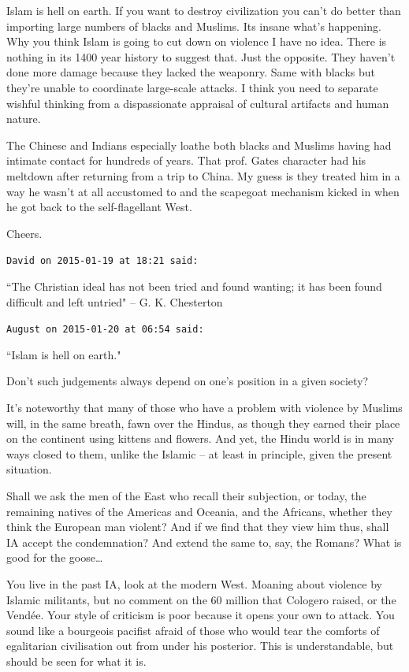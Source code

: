 \begin{footnotesize}
\begin{sffamily}
Islam is hell on earth. If you want to destroy civilization you can't do better than importing large numbers of blacks and Muslims. Its insane what's happening. Why you think Islam is going to cut down on violence I have no idea. There is nothing in its 1400 year history to suggest that. Just the opposite. They haven't done more damage because they lacked the weaponry. Same with blacks but they're unable to coordinate large-scale attacks. I think you need to separate wishful thinking from a dispassionate appraisal of cultural artifacts and human nature.

The Chinese and Indians especially loathe both blacks and Muslims having had intimate contact for hundreds of years. That prof. Gates character had his meltdown after returning from a trip to China. My guess is they treated him in a way he wasn't at all accustomed to and the scapegoat mechanism kicked in when he got back to the self-flagellant West.

Cheers.


\hfill

\texttt{David on 2015-01-19 at 18:21 said: }

``The Christian ideal has not been tried and found wanting; it has been found difficult and left untried" – G. K. Chesterton


\hfill

\texttt{August on 2015-01-20 at 06:54 said: }

``Islam is hell on earth."

Don't such judgements always depend on one's position in a given society?

It's noteworthy that many of those who have a problem with violence by Muslims will, in the same breath, fawn over the Hindus, as though they earned their place on the continent using kittens and flowers. And yet, the Hindu world is in many ways closed to them, unlike the Islamic – at least in principle, given the present situation.

Shall we ask the men of the East who recall their subjection, or today, the remaining natives of the Americas and Oceania, and the Africans, whether they think the European man violent? And if we find that they view him thus, shall IA accept the condemnation? And extend the same to, say, the Romans? What is good for the goose…

You live in the past IA, look at the modern West. Moaning about violence by Islamic militants, but no comment on the 60 million that Cologero raised, or the Vendée. Your style of criticism is poor because it opens your own to attack. You sound like a bourgeois pacifist afraid of those who would tear the comforts of egalitarian civilisation out from under his posterior. This is understandable, but should be seen for what it is.



\end{sffamily}
\end{footnotesize}
